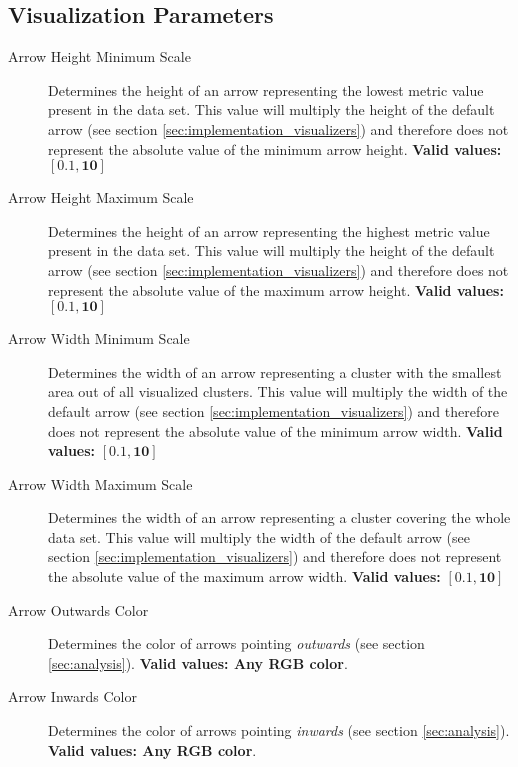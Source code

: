 \subsection{Visualization Parameters}

\begin{description}
\item [Arrow Height Minimum Scale] Determines the height of an arrow representing the lowest metric value present in the data set. This value will multiply the height of the default arrow (see section \ref{sec:implementation_visualizers}) and therefore does not represent the absolute value of the minimum arrow height. {\bf Valid values:} \(\bm{[0.1,10]}\)

\item [Arrow Height Maximum Scale] Determines the height of an arrow representing the highest metric value present in the data set. This value will multiply the height of the default arrow (see section \ref{sec:implementation_visualizers}) and therefore does not represent the absolute value of the maximum arrow height. {\bf Valid values:} \(\bm{[0.1,10]}\)

\item [Arrow Width Minimum Scale] Determines the width of an arrow representing a cluster with the smallest area out of all visualized clusters. This value will multiply the width of the default arrow (see section \ref{sec:implementation_visualizers}) and therefore does not represent the absolute value of the minimum arrow width. {\bf Valid values:} \(\bm{[0.1,10]}\)

\item [Arrow Width Maximum Scale] Determines the width of an arrow representing a cluster covering the whole data set. This value will multiply the width of the default arrow (see section \ref{sec:implementation_visualizers}) and therefore does not represent the absolute value of the maximum arrow width. {\bf Valid values:} \(\bm{[0.1,10]}\)

\item [Arrow Outwards Color] Determines the color of arrows pointing {\it outwards} (see section \ref{sec:analysis}). {\bf Valid values: Any RGB color}.

\item [Arrow Inwards Color] Determines the color of arrows pointing {\it inwards} (see section \ref{sec:analysis}). {\bf Valid values: Any RGB color}.


\end{description}
